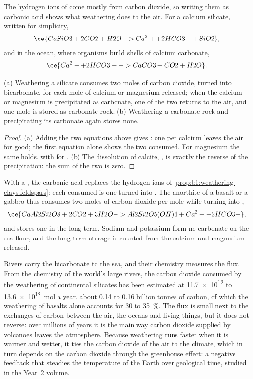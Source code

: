 The hydrogen ions of  come mostly from carbon dioxide, so writing them
as carbonic acid shows what weathering does to the air. For a calcium silicate,
written  for simplicity,
\[
  \ce{CaSiO3 + 2 CO2 + H2O -> Ca^2+ + 2 HCO3- + SiO2},
\]
and in the ocean, where organisms build shells of calcium carbonate,
\[
  \ce{Ca^2+ + 2 HCO3- -> CaCO3 + CO2 + H2O}.
\]

\begin{proposition}\label{prop:b1:weathering-clays:co2}
(a) Weathering a silicate consumes two moles of carbon dioxide, turned into
bicarbonate, for each mole of calcium or magnesium released; when the calcium
or magnesium is precipitated as carbonate, one of the two returns to the air,
and one mole is stored as carbonate rock. (b) Weathering a carbonate rock and
precipitating its carbonate again stores none.
\end{proposition}

\begin{proof}
(a) Adding the two equations above gives :
one  per calcium leaves the air for good; the first equation alone
shows the two consumed. For magnesium the same holds, with  for
. (b) The dissolution of calcite, , is exactly the reverse of the precipitation: the sum of the two is zero.
\end{proof}

With a , the carbonic acid replaces the hydrogen ions of
\cref{prop:b1:weathering-clays:feldspars}: each  consumed is one
 turned into . The anorthite of a basalt or a gabbro thus
consumes two moles of carbon dioxide per mole while turning into ,
\[
  \ce{CaAl2Si2O8 + 2 CO2 + 3 H2O -> Al2Si2O5(OH)4 + Ca^2+ + 2 HCO3-},
\]
and stores one in the long term. Sodium and potassium form no carbonate on the
sea floor, and the long-term storage is counted from the calcium and magnesium
released.

Rivers carry the bicarbonate to the sea, and their chemistry measures the flux.
From the chemistry of the world's large rivers, the carbon dioxide consumed by the
weathering of continental silicates has been estimated at \num{11.7e12} to
\qty{13.6e12}{mol} a year, about 0.14 to 0.16 billion tonnes of carbon, of which
the weathering of basalts alone accounts for 30 to \qty{35}{\percent}. The flux is small next to
the exchanges of carbon between the air, the oceans and living things, but it
does not reverse: over millions of years it is the main way carbon dioxide
supplied by volcanoes leaves the atmosphere. Because weathering runs faster when
it is warmer and wetter, it ties the carbon dioxide of the air to the climate,
which in turn depends on the carbon dioxide through the greenhouse effect: a
negative feedback that steadies the temperature of the Earth over geological
time, studied in the Year~2 volume.

